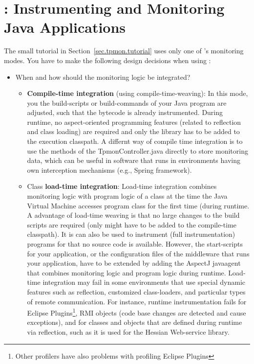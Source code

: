 \documentclass[a4paper,12pt]{scrartcl}
\begin{document}
\section{\tpmon{}: Instrumenting and Monitoring Java Applications}\label{sec.tpmon}

The small tutorial in Section~\ref{sec.tpmon.tutorial} uses only one of \tpmon{}'s monitoring modes. You have to make the following design decisions when using \tpmon{}:
\begin{itemize}
 \item When and how should the monitoring logic be integrated?
\begin{itemize}
 \item \textbf{Compile-time integration} (using compile-time-weaving): In this mode, you the build-scripts or build-commands of your Java program are adjusted, such that the bytecode is already instrumented. During runtime, no aspect-oriented programming features (related to reflection and class loading) are required and only the \tpmon{} library has to be added to the execution classpath. A differnt way of compile time integration is to use the methods of the TpmonController.java directly to store monitoring data, which can be useful in software that runs in environments having own interception mechanisms (e.g., Spring framework).
\item Class \textbf{load-time integration}: Load-time integration combines monitoring logic with program logic of a class at the time the Java Virtual Machine accesses program class for the first time (during runtime. A advantage of load-time weaving is that no large changes to the build scripts are required (only \tpmon{} might have to be added to the compile-time classpath). It is can also be used to instrument (full instrumentation) programs for that no source code is available. However, the start-scripts for your application, or the configuration files of the middleware that runs your application, have to be extended by adding the AspectJ javaagent that combines monitoring logic and program logic during runtime. Load-time integration may fail in some environments that use special dynamic features such as reflection, customized class-loaders, and particular types of remote communication. For instance, runtime instrumentation fails for Eclipse Plugins\footnote{Other profilers have also problems with profiling Eclipse Plugins}, RMI objects (code base changes are detected and cause exceptions), and for classes and objects that are defined during runtime via reflection, such as it is used for the Hessian Web-service library.

\end{itemize}
\end{itemize}
\end{document}
